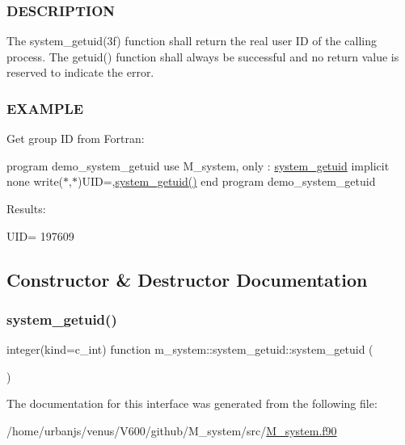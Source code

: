 \subsubsection*{D\+E\+S\+C\+R\+I\+P\+T\+I\+ON}

The system\+\_\+getuid(3f) function shall return the real user ID of the calling process. The getuid() function shall always be successful and no return value is reserved to indicate the error. \subsubsection*{E\+X\+A\+M\+P\+LE}

Get group ID from Fortran\+:

program demo\+\_\+system\+\_\+getuid use M\+\_\+system, only \+: \mbox{\hyperlink{interfacem__system_1_1system__getuid}{system\+\_\+getuid}} implicit none write($\ast$,$\ast$)\textquotesingle{}U\+ID=\textquotesingle{},\mbox{\hyperlink{interfacem__system_1_1system__getuid_adb2147a5c9768d09bd7741b07f02af05}{system\+\_\+getuid()}} end program demo\+\_\+system\+\_\+getuid

Results\+:

U\+ID= 197609 

\subsection{Constructor \& Destructor Documentation}
\mbox{\label{interfacem__system_1_1system__getuid_adb2147a5c9768d09bd7741b07f02af05}} 
\subsubsection{\texorpdfstring{system\+\_\+getuid()}{system\_getuid()}}
{\footnotesize\ttfamily integer(kind=c\+\_\+int) function m\+\_\+system\+::system\+\_\+getuid\+::system\+\_\+getuid (\begin{DoxyParamCaption}{ }\end{DoxyParamCaption})\hspace{0.3cm}{\ttfamily [private]}}



The documentation for this interface was generated from the following file\+:\begin{DoxyCompactItemize}
\item 
/home/urbanjs/venus/\+V600/github/\+M\+\_\+system/src/\mbox{\hyperlink{M__system_8f90}{M\+\_\+system.\+f90}}\end{DoxyCompactItemize}
